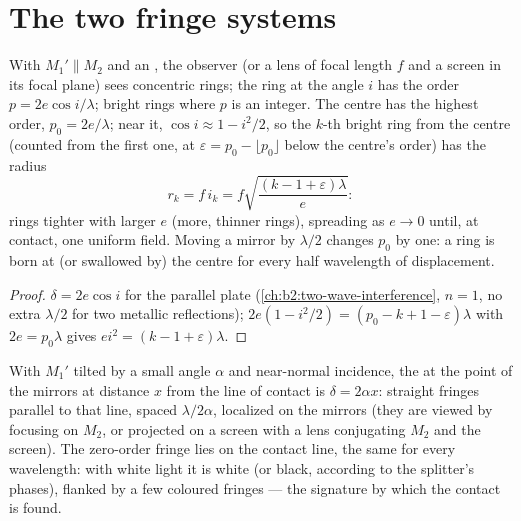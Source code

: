 \section{The two fringe systems}

\begin{proposition}\label{prop:b2:michelson:rings}
With $M_1' \parallel M_2$ and an , the observer (or a lens
of focal length $f$ and a screen in its focal plane) sees concentric
rings; the ring at the angle $i$ has the order $p = 2e\cos i/\lambda$; bright
rings where $p$ is an integer. The centre has the highest order, $p_0 =
2e/\lambda$; near it, $\cos i \approx 1 - i^2/2$, so the $k$-th bright ring from the
centre (counted from the first one, at $\varepsilon = p_0 - \lfloor p_0\rfloor$
below the centre's order) has the radius
\[
r_k = f\,i_k = f\sqrt{\frac{(k - 1 + \varepsilon)\lambda}e} :
\]
rings tighter with larger $e$ (more, thinner rings), spreading as $e \to 0$
until, at contact, one uniform field. Moving a mirror by $\lambda/2$ changes
$p_0$ by one: a ring is born at (or swallowed by) the centre for every
half wavelength of displacement.
\end{proposition}

\begin{proof}
$\delta = 2e\cos i$ for the parallel plate (\cref{ch:b2:two-wave-interference},
$n = 1$, no extra $\lambda/2$ for two metallic reflections); $2e(1 - i^2/2) =
(p_0 - k + 1 - \varepsilon)\lambda$ with $2e = p_0\lambda$ gives $ei^2 = (k - 1 + \varepsilon)\lambda$.
\end{proof}

\begin{proposition}\label{prop:b2:michelson:wedge}
With $M_1'$ tilted by a small angle $\alpha$ and near-normal incidence, the
 at the point of the mirrors at distance $x$ from the
line of contact is $\delta = 2\alpha x$: straight fringes parallel to that line,
spaced $\lambda/2\alpha$, localized on the mirrors (they are viewed by focusing
on $M_2$, or projected on a screen with a lens conjugating $M_2$ and the
screen). The zero-order fringe lies on the contact line, the same for
every wavelength: with white light it is white (or black, according to
the splitter's phases), flanked by a few coloured fringes --- the
signature by which the contact is found.
\end{proposition}

